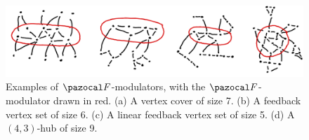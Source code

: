 \begin{figure}
    \includegraphics[width=\textwidth]{figures/fkv-graph-example.png}
    \caption{Examples of $\F$-modulators, with the $\F$-modulator drawn in red. (a) A vertex cover of size 7. (b) A feedback vertex set of size 6. (c) A linear feedback vertex set of size 5. (d) A $(4, 3)$-hub of size 9. }
    \label{fig:fkv-graph-example}
\end{figure}